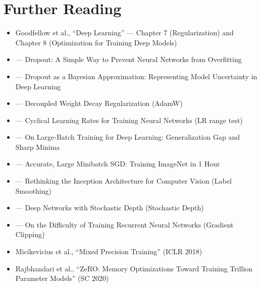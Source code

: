 \section{Further Reading}

\begin{itemize}
    \item Goodfellow et al., ``Deep Learning'' \cite{goodfellow2016deep} --- Chapter 7 (Regularization) and Chapter 8 (Optimization for Training Deep Models)
    \item \cite{srivastava2014dropout} --- Dropout: A Simple Way to Prevent Neural Networks from Overfitting
    \item \cite{gal2016dropout} --- Dropout as a Bayesian Approximation: Representing Model Uncertainty in Deep Learning
    \item \cite{loshchilov2019decoupled} --- Decoupled Weight Decay Regularization (AdamW)
    \item \cite{smith2017cyclical} --- Cyclical Learning Rates for Training Neural Networks (LR range test)
    \item \cite{keskar2017largebatch} --- On Large-Batch Training for Deep Learning: Generalization Gap and Sharp Minima
    \item \cite{goyal2017accurate} --- Accurate, Large Minibatch SGD: Training ImageNet in 1 Hour
    \item \cite{szegedy2016rethinking} --- Rethinking the Inception Architecture for Computer Vision (Label Smoothing)
    \item \cite{huang2016deep} --- Deep Networks with Stochastic Depth (Stochastic Depth)
    \item \cite{pascanu2013difficulty} --- On the Difficulty of Training Recurrent Neural Networks (Gradient Clipping)
    \item Micikevicius et al., ``Mixed Precision Training'' (ICLR 2018)
    \item Rajbhandari et al., ``ZeRO: Memory Optimizations Toward Training Trillion Parameter Models'' (SC 2020)
\end{itemize}
